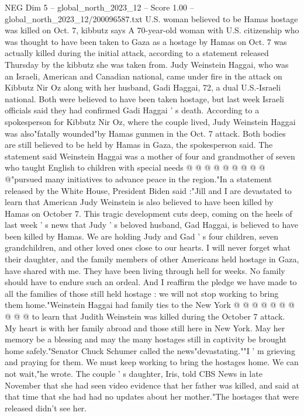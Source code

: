 \begin{textsample}{NEG Dim 5 – global\_north\_2023\_12 – Score 1.00 – global\_north\_2023\_12/200096587.txt}  \label{ex:f5_neg_119}
U.S. woman believed to be Hamas hostage was killed on Oct. 7, kibbutz says A 70-year-old woman with U.S. citizenship who was thought to have been taken to Gaza as a hostage by Hamas on Oct. 7 was actually killed during the initial attack, according to a statement released Thursday by the kibbutz she was taken from.
Judy Weinstein Haggai, who was an Israeli, American and Canadian national, came under fire in the attack on Kibbutz Nir Oz along with her husband, Gadi Haggai, 72, a dual U.S.-Israeli national.
Both were believed to have been taken hostage, but last week Israeli officials said they had confirmed Gadi Haggai ' s death.
According to a spokesperson for Kibbutz Nir Oz, where the couple lived, Judy Weinstein Haggai was also"fatally wounded"by Hamas gunmen in the Oct. 7 attack.
Both bodies are still believed to be held by Hamas in Gaza, the spokesperson said.
The statement said Weinstein Haggai was a mother of four and grandmother of seven who taught English to children with special needs @ @ @ @ @ @ @ @ @ @"pursued many initiatives to advance peace in the region."In a statement released by the White House, President Biden said :"Jill and I are devastated to learn that American Judy Weinstein is also believed to have been killed by Hamas on October 7.
This tragic development cuts deep, coming on the heels of last week ' s news that Judy ' s beloved husband, Gad Haggai, is believed to have been killed by Hamas.
We are holding Judy and Gad ' s four children, seven grandchildren, and other loved ones close to our hearts.
I will never forget what their daughter, and the family members of other Americans held hostage in Gaza, have shared with me.
They have been living through hell for weeks.
No family should have to endure such an ordeal.
And I reaffirm the pledge we have made to all the families of those still held hostage : we will not stop working to bring them home."Weinstein Haggai had family ties to the New York @ @ @ @ @ @ @ @ @ @ to learn that Judith Weinstein was killed during the October 7 attack.
My heart is with her family abroad and those still here in New York.
May her memory be a blessing and may the many hostages still in captivity be brought home safely."Senator Chuck Schumer called the news"devastating.""I ' m grieving and praying for them.
We must keep working to bring the hostages home.
We can not wait,"he wrote.
The couple ' s daughter, Iris, told CBS News in late November that she had seen video evidence that her father was killed, and said at that time that she had had no updates about her mother."The hostages that were released didn't see her.

\end{textsample}
